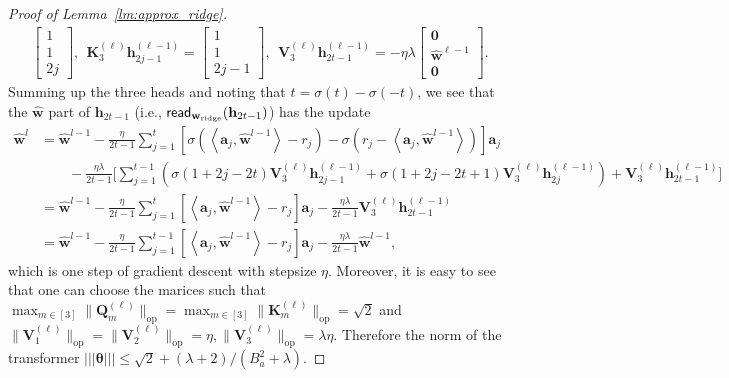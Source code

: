 \documentclass[10pt]{article}
\renewcommand{\hat}{\widehat}
\newcommand{\lops}[1]{\|{#1}\|_{\mathrm{op}}}
\newcommand{\<}{\left\langle}
\renewcommand{\>}{\right\rangle}
\renewcommand{\bQ}{\mathbf{Q}}
\newcommand{\lth}{{(\ell)}}
\newcommand{\bzero}{{\mathbf 0}}
\renewcommand{\read}{{\sf read}}
\newcommand{\ridge}{{\rm ridge}}
\newcommand{\nrmp}[1]{{\left|\!\left|\!\left|{#1}\right|\!\right|\!\right|}}
\def\bK{{\mathbf K}}
\def\bQ{{\mathbf Q}}
\def\bV{{\mathbf V}}
\def\btheta{{\boldsymbol \theta}}
\def\ba{{\mathbf a}}
\def\bh{{\mathbf h}}
\def\bw{{\mathbf w}}
\begin{document}
\begin{proof}[Proof of Lemma~\ref{lm:approx_ridge}]
\begin{align*}
\begin{bmatrix}
        1\\ 1 \\2j
    \end{bmatrix},~~ \bK_3^{(\ell)}\bh^{(\ell-1)}_{2j-1}=\begin{bmatrix}
        1\\ 1 \\2j-1
    \end{bmatrix},~~ \bV_3^{(\ell)}\bh^{(\ell-1)}_{2t-1}=-\eta\lambda\begin{bmatrix}
        \bzero\\ \hat\bw^{\ell-1}\\ \bzero
    \end{bmatrix}.
\end{align*}
Summing up the three heads and noting that $t=\sigma(t)-\sigma(-t)$, we see that the $\hat\bw$ part of $\bh_{2t-1}$ (i.e., $\read_{\bw_\ridge}(\bh_{2t-1})$) has the update
\begin{align*}
    \hat\bw^{l}
    &=\hat\bw^{l-1}-\frac{\eta}{2t-1}\sum_{j=1}^t[\sigma(\<\ba_j,\hat\bw^{l-1}\>-r_j)-\sigma(r_j-\<\ba_j,\hat\bw^{l-1}\>)]\ba_j\\&
    \qquad
    -\frac{\eta\lambda}{2t-1}\Big[\sum_{j=1}^{t-1}(\sigma(1+2j-2t)\bV_3^{(\ell)}\bh^{(\ell-1)}_{2j-1}+\sigma(1+2j-2t+1)\bV_3^{(\ell)}\bh^{(\ell-1)}_{2j})+
   \bV_3^{(\ell)}\bh^{(\ell-1)}_{2t-1}\Big]\\
     &=\hat\bw^{l-1}-\frac{\eta}{2t-1}\sum_{j=1}^t[\<\ba_j,\hat\bw^{l-1}\>-r_j]\ba_j-\frac{\eta\lambda}{2t-1}\bV_3^{(\ell)}\bh^{(\ell-1)}_{2t-1}\\
     &=\hat\bw^{l-1}-\frac{\eta}{2t-1}\sum_{j=1}^{t-1}[\<\ba_j,\hat\bw^{l-1}\>-r_j]\ba_j-\frac{\eta\lambda}{2t-1}\hat\bw^{l-1},
\end{align*}
which is one step of gradient descent with stepsize $\eta$.  Moreover, it is easy to see that one can choose the marices such that $\max_{m\in[3]}\lops{\bQ^\lth_m}=\max_{m\in[3]}\lops{\bK^\lth_m}=\sqrt{2}$ and $\lops{\bV^\lth_1}=\lops{\bV^\lth_2}=\eta,\lops{\bV^\lth_3}= \lambda\eta$. Therefore the norm of the transformer $\nrmp{\btheta}\leq \sqrt{2}+(\lambda+2)/(B_a^2+\lambda)$.

\end{proof}
\end{document}
